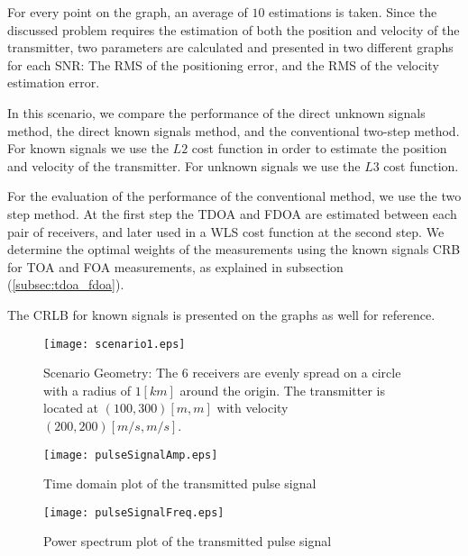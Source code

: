 For every point on the graph, an average of $10$ estimations is taken.
Since the discussed problem requires the estimation of both the position and velocity of the transmitter, two parameters are calculated and presented in two different graphs for each SNR: The RMS of the positioning error, and the RMS of the velocity estimation error.

In this scenario, we compare the performance of the direct unknown signals method, the direct known signals method, and the conventional two-step method.
For known signals we use the $L2$ cost function in order to estimate the position and velocity of the transmitter. For unknown signals we use the $L3$ cost function.

For the evaluation of the performance of the conventional method, we use the two step method.
At the first step the TDOA and FDOA are estimated between each pair of receivers, and later used in a WLS cost function at the second step. We determine the optimal weights of the measurements using the known signals CRB for TOA and FOA measurements, as explained in subsection (\ref{subsec:tdoa_fdoa}).

The CRLB for known signals is presented on the graphs as well for reference.

\begin{figure}
\begin{center}
\texttt{[image: scenario1.eps]} 
\end{center}
\caption{Scenario Geometry: The 6 receivers are evenly spread on a circle with a radius of $1[km]$ around the origin. The transmitter is located at $(100,300)[m,m]$ with velocity $(200,200)[m/s,m/s]$.}
\label{fig:scenario1_geometry}
\end{figure}


\begin{figure}
\begin{center}
\texttt{[image: pulseSignalAmp.eps]} 
\end{center}
\caption{Time domain plot of the transmitted pulse signal}
\label{fig:pulseSignalAmp}
\end{figure}

\begin{figure}
\begin{center}
\texttt{[image: pulseSignalFreq.eps]} 
\end{center}
\caption{Power spectrum plot of the transmitted pulse signal}
\label{fig:pulseSignalFreq}
\end{figure}

